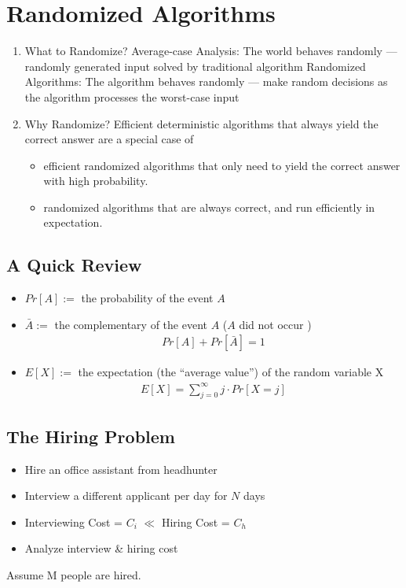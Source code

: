 \newpage
\section{Randomized Algorithms}
\begin{enumerate}\small
    \item What to Randomize?
    \subitem Average-case Analysis: The world behaves randomly --- randomly generated input solved by traditional algorithm
    \subitem Randomized Algorithms: The algorithm behaves randomly --- make random decisions as the algorithm processes the worst-case input
    \item Why Randomize?
    \subitem Efficient deterministic algorithms that always yield the correct answer are a special case of 
    \begin{itemize}
        \item efficient randomized algorithms that only need to yield the correct answer with high probability. \item randomized algorithms that are always correct, and run efficiently in expectation. 
    \end{itemize}
\end{enumerate}

\subsection{A Quick Review}
\begin{itemize}
    \item $Pr[A]:=$ the probability of the event $A$
    \item $\bar{A}:=$ the complementary of the event $A$ ($A$ did not occur )
    \begin{align*}
        Pr[A]+Pr[\bar{A}]=1
    \end{align*}
    \item $E[X]:=$ the expectation (the ``average value'') of the random variable X
    \begin{align*}
        E[X]=\sum_{j=0}^\infty j \cdot Pr[X=j]
    \end{align*}
\end{itemize}

\subsection{The Hiring Problem}
\begin{itemize}
    \item Hire an office assistant from headhunter 
    \item Interview a different applicant per day for $N$ days
    \item Interviewing Cost = $C_i$  $\ll$  Hiring Cost = $C_h$
    \item Analyze interview \& hiring cost 
\end{itemize}
Assume M people are hired.

